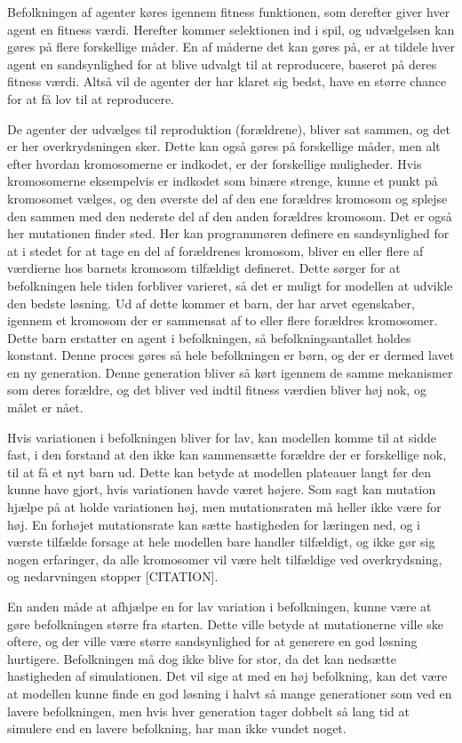\par
Befolkningen af agenter køres igennem fitness funktionen, som derefter giver hver agent en fitness værdi. Herefter kommer selektionen ind i spil, og udvælgelsen kan gøres på flere forskellige måder. En af måderne det kan gøres på, er at tildele hver agent en sandsynlighed for at blive udvalgt til at reproducere, baseret på deres fitness værdi. Altså vil de agenter der har klaret sig bedst, have en større chance for at få lov til at reproducere.
\par
De agenter der udvælges til reproduktion (forældrene), bliver sat sammen, og det er her overkrydsningen sker. Dette kan også gøres på forskellige måder, men alt efter hvordan kromosomerne er indkodet, er der forskellige muligheder. Hvis kromosomerne eksempelvis er indkodet som binære strenge, kunne et punkt på kromosomet vælges, og den øverste del af den ene forældres kromosom og splejse den sammen med den nederste del af den anden forældres kromosom. Det er også her mutationen finder sted. Her kan programmøren definere en sandsynlighed for at i stedet for at tage en del af forældrenes kromosom, bliver en eller flere af værdierne hos barnets kromosom tilfældigt defineret. Dette sørger for at befolkningen hele tiden forbliver varieret, så det er muligt for modellen at udvikle den bedste løsning. Ud af dette kommer et barn, der har arvet egenskaber, igennem et kromosom der er sammensat af to eller flere forældres kromosomer. Dette barn erstatter en agent i befolkningen, så befolkningsantallet holdes konstant. Denne proces gøres så hele befolkningen er børn, og der er dermed lavet en ny generation. Denne generation bliver så kørt igennem de samme mekanismer som deres forældre, og det bliver ved indtil fitness værdien bliver høj nok, og målet er nået.
\par
Hvis variationen i befolkningen bliver for lav, kan modellen komme til at sidde fast, i den forstand at den ikke kan sammensætte forældre der er forskellige nok, til at få et nyt barn ud. Dette kan betyde at modellen plateauer langt før den kunne have gjort, hvis variationen havde været højere. Som sagt kan mutation hjælpe på at holde variationen høj, men mutationsraten må heller ikke være for høj.  En forhøjet mutationsrate kan sætte hastigheden for læringen ned, og i værste tilfælde forsage at hele modellen bare handler tilfældigt, og ikke gør sig nogen erfaringer, da alle kromosomer vil være helt tilfældige ved overkrydsning, og nedarvningen stopper [CITATION]. 
\par
En anden måde at afhjælpe en for lav variation i befolkningen, kunne være at gøre befolkningen større fra starten. Dette ville betyde at mutationerne ville ske oftere, og der ville være større sandsynlighed for at generere en god løsning hurtigere. Befolkningen må dog ikke blive for stor, da det kan nedsætte hastigheden af simulationen. Det vil sige at med en høj befolkning, kan det være at modellen kunne finde en god løsning i halvt så mange generationer som ved en lavere befolkningen, men hvis hver generation tager dobbelt så lang tid at simulere end en lavere befolkning, har man ikke vundet noget.
